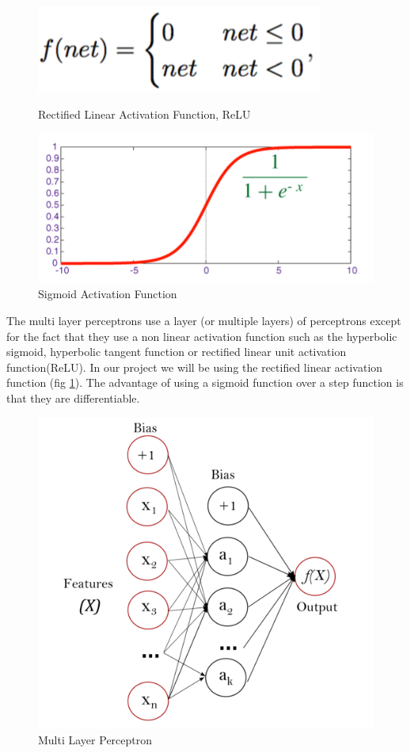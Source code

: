 \documentclass[conference]{IEEEtran}
\begin{document}
 \begin{figure}[h!]
\centering
\includegraphics[scale=0.5]{RELU}
\caption{Rectified Linear Activation Function, ReLU }

\includegraphics[scale=0.45]{sigmoid}
\caption{Sigmoid Activation Function}

\label{relu}
\end{figure}
 
The multi layer perceptrons use a layer (or multiple layers) of perceptrons except for the fact that they use a non linear activation function such as the hyperbolic sigmoid, hyperbolic tangent function or rectified linear unit activation function(ReLU). In our project we will be using the rectified linear activation function (fig \ref{relu}). The advantage of using a sigmoid function over a step function is that they are differentiable. 
 
 \begin{figure}[h!]
\centering
\includegraphics[scale=0.45]{MLP}
\caption{Multi Layer Perceptron \cite{MLPfigure}}
\label{MLP}
\end{figure}
 
\end{document}
